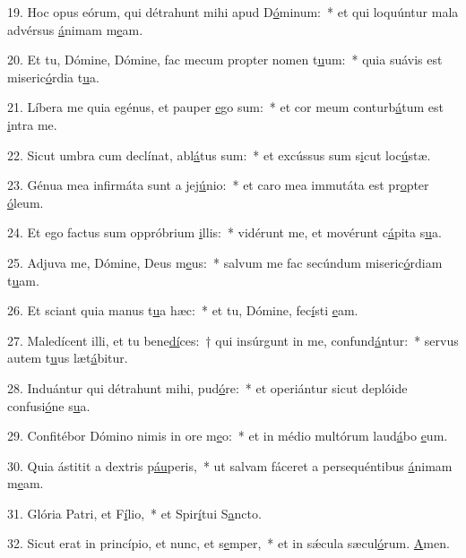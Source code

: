 19. Hoc opus eórum, qui détrahunt mihi apud D\uline{ó}minum:~* et qui loquúntur mala advérsus \uline{á}nimam m\uline{e}am.\par 
20. Et tu, Dómine, Dómine, fac mecum propter nomen t\uline{u}um:~* quia suávis est miseric\uline{ó}rdia t\uline{u}a.\par 
21. Líbera me quia egénus, et pauper \uline{e}go sum:~* et cor meum conturb\uline{á}tum est \uline{i}ntra me.\par 
22. Sicut umbra cum declínat, abl\uline{á}tus sum:~* et excússus sum s\uline{i}cut loc\uline{ú}stæ.\par 
23. Génua mea infirmáta sunt a jej\uline{ú}nio:~* et caro mea immutáta est pr\uline{o}pter \uline{ó}leum.\par 
24. Et ego factus sum oppróbrium \uline{i}llis:~* vidérunt me, et movérunt c\uline{á}pita s\uline{u}a.\par 
25. Adjuva me, Dómine, Deus m\uline{e}us:~* salvum me fac secúndum miseric\uline{ó}rdiam t\uline{u}am.\par 
26. Et sciant quia manus t\uline{u}a hæc:~* et tu, Dómine, fec\uline{í}sti \uline{e}am.\par 
27. Maledícent illi, et tu bene\uline{dí}ces:~† qui insúrgunt in me, confund\uline{á}ntur:~* servus autem t\uline{u}us læt\uline{á}bitur.\par 
28. Induántur qui détrahunt mihi, pud\uline{ó}re:~* et operiántur sicut deplóide confusi\uline{ó}ne s\uline{u}a.\par 
29. Confitébor Dómino nimis in ore m\uline{e}o:~* et in médio multórum laud\uline{á}bo \uline{e}um.\par 
30. Quia ástitit a dextris p\uline{áu}peris,~* ut salvam fáceret a persequéntibus \uline{á}nimam m\uline{e}am.\par 
31. Glória Patri, et F\uline{í}lio,~* et Spir\uline{í}tui S\uline{a}ncto.\par 
32. Sicut erat in princípio, et nunc, et s\uline{e}mper,~* et in sǽcula sæcul\uline{ó}rum. \uline{A}men.\par 
